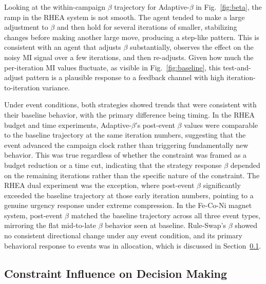 Looking at the within-campaign $\beta$ trajectory for Adaptive-$\beta$ in Fig.~\ref{fig:beta}, the ramp in the RHEA system is not smooth. The agent tended to make a large adjustment to $\beta$ and then hold for several iterations of smaller, stabilizing changes before making another large move, producing a step-like pattern. This is consistent with an agent that adjusts $\beta$ substantially, observes the effect on the noisy MI signal over a few iterations, and then re-adjusts. Given how much the per-iteration MI values fluctuate, as visible in Fig.~\ref{fig:baseline}, this test-and-adjust pattern is a plausible response to a feedback channel with high iteration-to-iteration variance.

Under event conditions, both strategies showed trends that were consistent with their baseline behavior, with the primary difference being timing. In the RHEA budget and time experiments, Adaptive-$\beta$'s post-event $\beta$ values were comparable to the baseline trajectory at the same iteration numbers, suggesting that the event advanced the campaign clock rather than triggering fundamentally new behavior. This was true regardless of whether the constraint was framed as a budget reduction or a time cut, indicating that the strategy response $\beta$ depended on the remaining iterations rather than the specific nature of the constraint. The RHEA dual experiment was the exception, where post-event $\beta$ significantly exceeded the baseline trajectory at those early iteration numbers, pointing to a genuine urgency response under extreme compression. In the Fe-Co-Ni magnet system, post-event $\beta$ matched the baseline trajectory across all three event types, mirroring the flat mid-to-late $\beta$ behavior seen at baseline. Rule-Swap's $\beta$ showed no consistent directional change under any event condition, and its primary behavioral response to events was in allocation, which is discussed in Section~\ref{sec:results-events-behavior}.

\subsection{Constraint Influence on Decision Making}
\label{sec:results-events-behavior}

